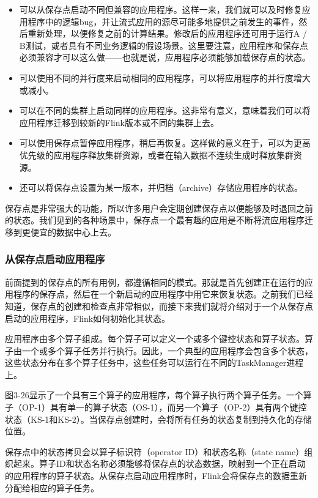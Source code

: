 \documentclass[oneside]{ctexbook}
\begin{document}
\begin{itemize}
  \item 可以从保存点启动不同但兼容的应用程序。这样一来，我们就可以及时修复应用程序中的逻辑bug，并让流式应用的源尽可能多地提供之前发生的事件，然后重新处理，以便修复之前的计算结果。修改后的应用程序还可用于运行A / B测试，或者具有不同业务逻辑的假设场景。这里要注意，应用程序和保存点必须兼容才可以这么做——也就是说，应用程序必须能够加载保存点的状态。
  \item 可以使用不同的并行度来启动相同的应用程序，可以将应用程序的并行度增大或减小。
  \item 可以在不同的集群上启动同样的应用程序。这非常有意义，意味着我们可以将应用程序迁移到较新的Flink版本或不同的集群上去。
  \item 可以使用保存点暂停应用程序，稍后再恢复。这样做的意义在于，可以为更高优先级的应用程序释放集群资源，或者在输入数据不连续生成时释放集群资源。
  \item 还可以将保存点设置为某一版本，并归档（archive）存储应用程序的状态。
\end{itemize}

保存点是非常强大的功能，所以许多用户会定期创建保存点以便能够及时退回之前的状态。我们见到的各种场景中，保存点一个最有趣的应用是不断将流应用程序迁移到更便宜的数据中心上去。

\subsubsection{从保存点启动应用程序}

前面提到的保存点的所有用例，都遵循相同的模式。那就是首先创建正在运行的应用程序的保存点，然后在一个新启动的应用程序中用它来恢复状态。之前我们已经知道，保存点的创建和检查点非常相似，而接下来我们就将介绍对于一个从保存点启动的应用程序，Flink如何初始化其状态。

应用程序由多个算子组成。每个算子可以定义一个或多个键控状态和算子状态。算子由一个或多个算子任务并行执行。因此，一个典型的应用程序会包含多个状态，这些状态分布在多个算子任务中，这些任务可以运行在不同的TaskManager进程上。

图3-26显示了一个具有三个算子的应用程序，每个算子执行两个算子任务。一个算子（OP-1）具有单一的算子状态（OS-1），而另一个算子（OP-2）具有两个键控状态（KS-1和KS-2）。当保存点创建时，会将所有任务的状态复制到持久化的存储位置。

保存点中的状态拷贝会以算子标识符（operator ID）和状态名称（state name）组织起来。算子ID和状态名称必须能够将保存点的状态数据，映射到一个正在启动的应用程序的算子状态。从保存点启动应用程序时，Flink会将保存点的数据重新分配给相应的算子任务。
\end{document}
